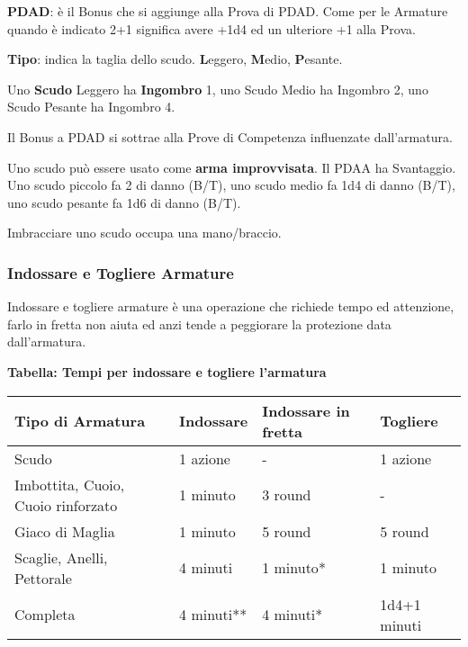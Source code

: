 \documentclass[12pt,a4paper,twoside,openany]{book}
\begin{document}
\begin{multicols}{2}

\medskip

\textbf{PDAD}: è il Bonus che si aggiunge alla Prova di PDAD. Come per le Armature quando è indicato 2+1 significa avere +1d4 ed un ulteriore +1 alla Prova.

\textbf{Tipo}: indica la taglia dello scudo. \textbf{L}eggero, \textbf{M}edio, \textbf{P}esante.

Uno \textbf{Scudo} Leggero ha \textbf{Ingombro} 1, uno Scudo Medio ha Ingombro 2, uno Scudo Pesante ha Ingombro 4.

Il Bonus a PDAD si sottrae alla Prove di Competenza influenzate dall'armatura.

Uno scudo può essere usato come \textbf{arma improvvisata}. Il PDAA ha Svantaggio. Uno scudo piccolo fa 2 di danno (B/T), uno scudo medio fa 1d4 di danno (B/T), uno scudo pesante fa 1d6 di danno (B/T).

Imbracciare uno scudo occupa una mano/braccio.

\subsubsection{Indossare e Togliere Armature}

Indossare e togliere armature è una operazione che richiede tempo ed attenzione, farlo in fretta non aiuta ed anzi tende a peggiorare la protezione data dall'armatura.

\end{multicols}

\textbf{Tabella: Tempi per indossare e togliere l'armatura}

\begin{tabular}{llll}
\textbf{Tipo di Armatura}& \textbf{Indossare} & \textbf{Indossare in fretta} & \textbf{Togliere}\\
\toprule
Scudo& 1 azione & - & 1 azione\\
Imbottita, Cuoio, Cuoio rinforzato  & 1 minuto& 3 round  & - \\
Giaco di Maglia& 1 minuto& 5 round  & 5 round\\
Scaglie, Anelli, Pettorale& 4 minuti & 1 minuto{*}  & 1 minuto\\
Completa  & 4 minuti{*}{*}& 4 minuti{*}& 1d4+1 minuti\\
\end{tabular}
\end{document}
